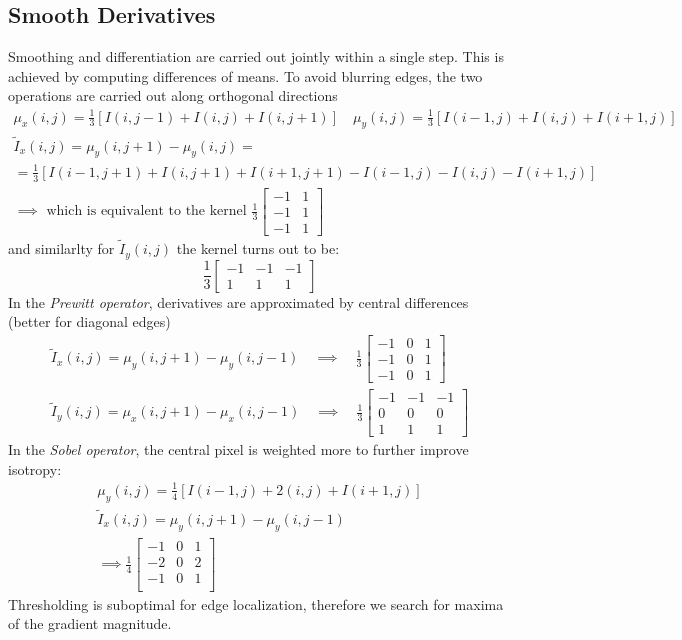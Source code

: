 \documentclass{article}
\begin{document}
\subsection{Smooth Derivatives}
Smoothing and differentiation are carried out jointly within a single step. This is achieved  by computing differences of means. To avoid blurring edges, the two operations are carried out along orthogonal directions
\begin{gather*}
    \mu_x(i,j)=\displaystyle\frac{1}{3}[I(i,j-1)+I(i,j)+I(i,j+1)] \quad \mu_y(i,j)=\displaystyle\frac{1}{3}[I(i-1,j)+I(i,j)+I(i+1,j)]\\
    \tilde{I}_x(i,j) = \mu_y(i,j+1)-\mu_y(i,j) =\\= \displaystyle\frac{1}{3}[I(i-1,j+1)+I(i,j+1)+I(i+1,j+1)-I(i-1,j)-I(i,j)-I(i+1,j)]\\
    \implies \text{ which is equivalent to the kernel }\displaystyle\frac{1}{3}\begin{bmatrix}
        -1 & 1 \\
        -1 & 1 \\
        -1 & 1 
    \end{bmatrix}
\end{gather*}
and similarlty for $\tilde{I}_y(i,j)$ the kernel turns out to be:
\[
    \displaystyle\frac{1}{3}\begin{bmatrix}
        -1 & -1 & -1 \\
        1 & 1 & 1
    \end{bmatrix}
\]
In the \emph{Prewitt operator}, derivatives are approximated by central differences (better for diagonal edges)
\begin{gather*}
    \tilde{I}_x(i,j)=\mu_y(i,j+1)-\mu_y(i,j-1) \quad \implies \quad \frac{1}{3} \begin{bmatrix}
        -1 & 0 & 1 \\
        -1 & 0 & 1 \\
        -1 & 0 & 1 
    \end{bmatrix}\\
    \tilde{I}_y(i,j)=\mu_x(i,j+1)-\mu_x(i,j-1) \quad \implies \quad \frac{1}{3} \begin{bmatrix}
        -1 & -1 & -1 \\
        0 & 0 & 0 \\
        1 & 1 & 1 
    \end{bmatrix}
\end{gather*}
In the \emph{Sobel operator}, the central pixel is weighted more to further improve isotropy:
\begin{gather*}
    \mu_y(i,j)=\displaystyle\frac{1}{4}[I(i-1,j)+2(i,j)+I(i+1,j)]\\
    \tilde{I}_x(i,j)= \mu_y(i,j+1)-\mu_y(i,j-1)\\
    \implies \displaystyle\frac{1}{4}\begin{bmatrix}
        -1 & 0 & 1 \\
        -2 & 0 & 2 \\
        -1 & 0 & 1 \\
    \end{bmatrix}
\end{gather*}
Thresholding is suboptimal for edge localization, therefore we search for maxima of the gradient magnitude. 
\end{document}
